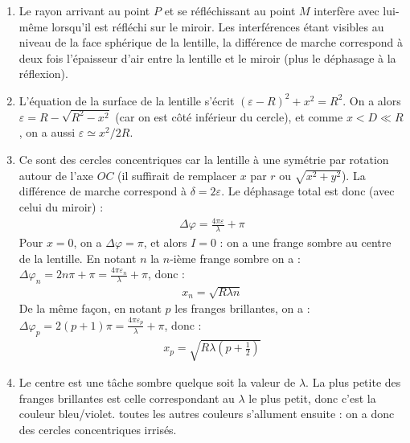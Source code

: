 \begin{correction}

\begin{enumerate}

	\item Le rayon arrivant au point $P$ et se réfléchissant au point $M$ interfère avec lui-même lorsqu'il est réfléchi sur le miroir. Les interférences étant visibles au niveau de la face sphérique de la lentille, la différence de marche correspond à deux fois l'épaisseur d'air entre la lentille et le miroir (plus le déphasage à la réflexion).
	
	\item L'équation de la surface de la lentille s'écrit $(\varepsilon-R)^2+x^2=R^2$. On a alors $\varepsilon=R-\sqrt{R^2-x^2}$ (car on est côté inférieur du cercle), et comme $x<D\ll R$, on a aussi $\varepsilon\simeq x^2/2R$.
	
	\item Ce sont des cercles concentriques car la lentille à une symétrie par rotation autour de l'axe $OC$ (il suffirait de remplacer $x$ par $r$ ou $\sqrt{x^2+y^2}$). La différence de marche correspond à $\delta=2\varepsilon$. Le déphasage total est donc (avec celui du miroir) :
	\begin{align*}
		\Delta \varphi = \frac{4\pi\varepsilon}{\lambda}+\pi
	\end{align*}
	Pour $x=0$, on a $\Delta \varphi = \pi$, et alors $I=0$ : on a une frange sombre au centre de la lentille. En notant $n$ la $n$-ième frange sombre on a : $\Delta\varphi_n=2n\pi+\pi=\frac{4\pi\varepsilon_n}{\lambda}+\pi$, donc :
	\begin{align*}
		x_n=\sqrt{R\lambda n}
	\end{align*}
	De la même façon, en notant $p$ les franges brillantes, on a :
	$\Delta\varphi_p=2(p+1)\pi=\frac{4\pi\varepsilon_p}{\lambda}+\pi$, donc :
	\begin{align*}
		x_p=\sqrt{R\lambda \left( p+\frac{1}{2}\right) }
	\end{align*}
	
	\item Le centre est une tâche sombre quelque soit la valeur de $\lambda$. La plus petite des franges brillantes est celle correspondant au $\lambda$ le plus petit, donc c'est la couleur bleu/violet. toutes les autres couleurs s'allument ensuite : on a donc des cercles concentriques irrisés. 

\end{enumerate}

\end{correction}

